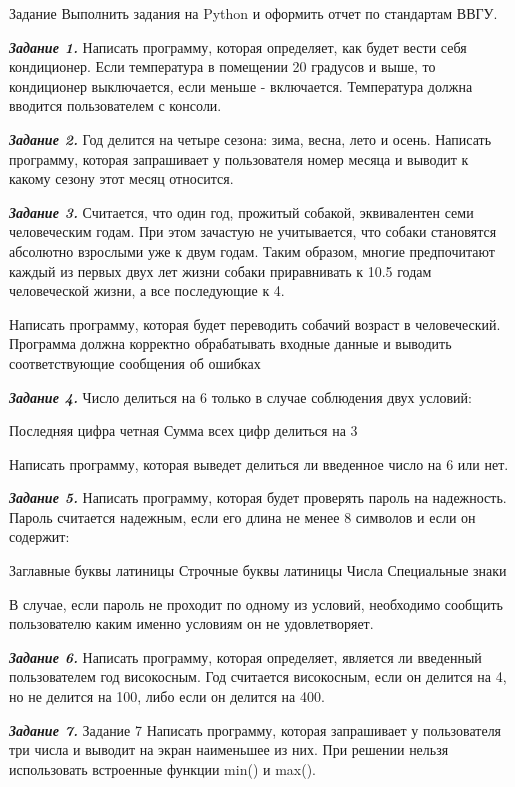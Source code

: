 \documentclass{vvsu}
\begin{document}
\begin{addition}{Задание}
    Выполнить задания на Python и оформить отчет по стандартам ВВГУ.

    \textit{\textbf{Задание 1.}}
    Написать программу, которая определяет, как будет вести себя кондиционер. Если температура в помещении 20 градусов и выше, то кондиционер выключается, если меньше - включается. Температура должна вводится пользователем с консоли.

    \textit{\textbf{Задание 2.}}
    Год делится на четыре сезона: зима, весна, лето и осень. Написать программу, которая запрашивает у пользователя номер месяца и выводит к какому сезону этот месяц относится.

    \textit{\textbf{Задание 3.}}
    Считается, что один год, прожитый собакой, эквивалентен семи человеческим годам. При этом зачастую не учитывается, что собаки становятся абсолютно взрослыми уже к двум годам. Таким образом, многие предпочитают каждый из первых двух лет жизни собаки приравнивать к 10.5 годам человеческой жизни, а все последующие к 4.

    Написать программу, которая будет переводить собачий возраст в человеческий. Программа должна корректно обрабатывать входные данные и выводить соответствующие сообщения об ошибках

    \textit{\textbf{Задание 4.}}
    Число делиться на 6 только в случае соблюдения двух условий:

        Последняя цифра четная
        Сумма всех цифр делиться на 3

    Написать программу, которая выведет делиться ли введенное число на 6 или нет.

    \textit{\textbf{Задание 5.}}
    Написать программу, которая будет проверять пароль на надежность. Пароль считается надежным, если его длина не менее 8 символов и если он содержит:

        Заглавные буквы латиницы
        Строчные буквы латиницы
        Числа
        Специальные знаки

    В случае, если пароль не проходит по одному из условий, необходимо сообщить пользователю каким именно условиям он не удовлетворяет.

    \textit{\textbf{Задание 6.}}
    Написать программу, которая определяет, является ли введенный пользователем год високосным. Год считается високосным, если он делится на 4, но не делится на 100, либо если он делится на 400.

    \textit{\textbf{Задание 7.}}
    Задание 7
    Написать программу, которая запрашивает у пользователя три числа и выводит на экран наименьшее из них. При решении нельзя использовать встроенные функции min() и max().


\end{addition}
\end{document}
